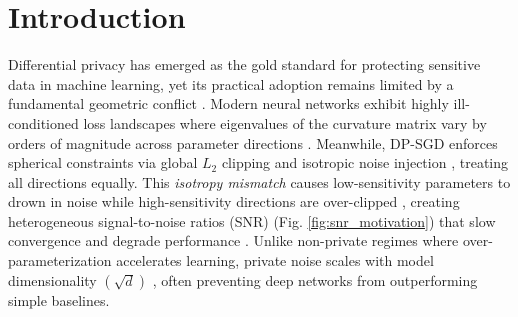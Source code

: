 \documentclass{article}
\theoremstyle{plain}
\theoremstyle{definition}
\theoremstyle{remark}
\begin{document}
\printAffiliationsAndNotice{}  %

\begin{abstract} 
Differentially private optimization suffers from a fundamental geometric mismatch: deep networks have highly anisotropic loss landscapes, yet DP-SGD injects isotropic noise. Second-order preconditioning can resolve this, but estimating curvature typically requires private data (consuming privacy budget) or public data (introducing distribution shift). We show that the Fisher Information Matrix decouples into \textit{architectural sensitivity}, recoverable via synthetic noise, and \textit{input correlations}, approximable from modality-specific frequency statistics. We propose DP-KFC, which constructs KFAC preconditioners by probing networks with structured synthetic noise, requiring neither private nor public data. Empirically, DP-KFC consistently outperforms DP-SGD and adaptive baselines across diverse modalities in strong privacy regimes ($\varepsilon \leq 3$). DP-KFC matches private-data preconditioners while public-data variants degrade by up to $4.8\%$, showing that curvature can be estimated without consuming privacy budget or introducing distribution shift. This enables privacy-preserving learning in specialized domains (e.g., medical applications) where regulatory constraints make data scarce.
\end{abstract}


\section{Introduction}
\label{sec:intro}
Differential privacy has emerged as the gold standard for protecting sensitive data in machine learning, yet its practical adoption remains limited by a fundamental geometric conflict \cite{Abadi_2016}. Modern neural networks exhibit highly ill-conditioned loss landscapes where eigenvalues of the curvature matrix vary by orders of magnitude across parameter directions \cite{Dauphin2014}. Meanwhile, DP-SGD enforces spherical constraints via global $L_2$ clipping and isotropic noise injection \cite{Dwork2013}, treating all directions equally. This \textit{isotropy mismatch} causes low-sensitivity parameters to drown in noise while high-sensitivity directions are over-clipped \cite{chen2020understanding}, creating heterogeneous signal-to-noise ratios (SNR) (Fig. \ref{fig:snr_motivation}) that slow convergence and degrade performance \cite{tramèr2021differentiallyprivatelearningneeds}. Unlike non-private regimes where over-parameterization accelerates learning, private noise scales with model dimensionality $(\sqrt{d})$ \cite{bassily2014differentiallyprivateempiricalrisk}, often preventing deep networks from outperforming simple baselines.
\end{document}
